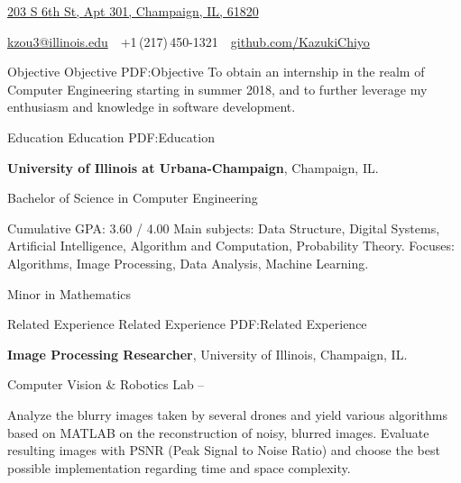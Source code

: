\documentclass[letterpaper,MMMyyyy,nonstopmode]{simpleresumecv}
\newcommand{\CVAuthor}{Kexuan (Klaus) Zou}
\newcommand{\CVWebpage}{github.com/KazukiChiyo}
\begin{document}

\Title{\CVAuthor}

\begin{SubTitle}
\href{https://www.google.com/maps/place/203+S+6th+St+%23301,+Champaign,+IL+61820/data=!4m2!3m1!1s0x880cd74138dff279:0xe4f8a0e84ef4eba7?sa=X&ved=0ahUKEwiX05qPhP_RAhVBxYMKHT6sAAMQ8gEIGzAA}
{203 S 6th St, Apt 301, Champaign, IL, 61820}
\par
\href{mailto:kzou3@illinois.edu}
{kzou3@illinois.edu}
\,\SubBulletSymbol\,
+1\,(217)\,450-1321
\,\SubBulletSymbol\,
\href{https://github.com/KazukiChiyo}
{\url{\CVWebpage}}
\end{SubTitle}

\begin{Body}
\Section
{Objective}
{Objective}
{PDF:Objective}
\Entry
To obtain an internship in the realm of Computer Engineering starting in summer 2018, and to further leverage my enthusiasm and knowledge in software development.

\Section
{Education}
{Education}
{PDF:Education}

\Entry
\textbf{University of Illinois at Urbana-Champaign},
Champaign, IL.

\Gap
\BulletItem
Bachelor of Science in Computer Engineering
\hfill
{}
\begin{Detail}
\SubBulletItem
Cumulative GPA: 3.60 / 4.00
\SubBulletItem
Main subjects: Data Structure, Digital Systems, Artificial Intelligence, Algorithm and Computation, Probability Theory.
\SubBulletItem
Focuses:
Algorithms, Image Processing, Data Analysis, Machine Learning.
\end{Detail}

\Gap
\BulletItem
Minor in Mathematics
\hfill
{}


\Section
{Related Experience}
{Related Experience}
{PDF:Related Experience}

\Entry
\textbf{Image Processing Researcher}, University of Illinois, Champaign, IL.

\Gap
\BulletItem
Computer Vision \& Robotics Lab
\hfill
{} --
\begin{Detail}
\SubBulletItem
Analyze the blurry images taken by several drones and yield various algorithms based on MATLAB on the reconstruction of noisy, blurred images.
\SubBulletItem
Evaluate resulting images with PSNR (Peak Signal to Noise Ratio) and choose the best possible implementation regarding time and space complexity.
\end{Detail}



\end{Body}
\end{document}

